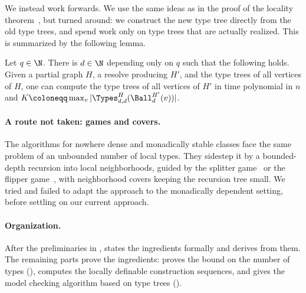 We instead work forwards.
We use the same ideas as in the proof of the locality theorem~\cite{locality-note}, but turned around:
we construct the new type tree directly from the old type trees, and spend work only on type trees that are actually realized.
This is summarized by the following lemma.

\begin{lemma}\label{lem:ov-resolve-lift}
  Let $q\in\N$. There is $d\in\N$ depending only on $q$ such that the following holds.
  Given a partial graph $H$, a resolve producing $H'$, and the type trees of all vertices of $H$,
  one can compute the type trees of all vertices of $H'$ in time polynomial in $n$ and
  $K\coloneqq\max_{v}|\Types^H_{d,d}(\Ball^{H'}_d(v))|$.
\end{lemma}

\paragraph{A route not taken: games and covers.}
The algorithms for nowhere dense and monadically stable classes face the same problem of an unbounded number of local types.
They sidestep it by a bounded-depth recursion into local neighborhoods, guided by the splitter game~\cite{gks} or the flipper game~\cite{flippers,ms-mc1,ms-mc2}, with neighborhood covers keeping the recursion tree small.
We tried and failed to adapt the approach to the monadically dependent setting, before settling on our current approach.

\paragraph{Organization.}
After the preliminaries in ,  states the ingredients formally and derives  from them.
The remaining parts prove the ingredients:
 proves the bound on the number of types (),
 computes the locally definable construction sequences,
and  gives the model checking algorithm based on type trees ().
